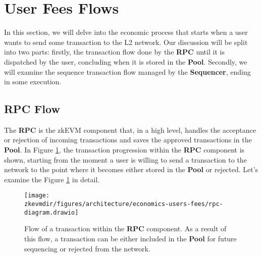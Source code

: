 


\section{User Fees Flows}

In this section, we will delve into the economic process that starts when a user wants to send some transaction to the L2 network. Our discussion will be split into two parts: firstly, the transaction flow done by the \textbf{RPC} until it is dispatched by the user, concluding when it is stored in the \textbf{Pool}. Secondly, we will examine the sequence transaction flow managed by the \textbf{Sequencer}, ending in some execution.

\subsection{RPC Flow}

The \textbf{RPC} is the zkEVM component that, in a high level, handles the acceptance or rejection of incoming transactions and saves the approved transactions in the \textbf{Pool}. In Figure \ref{fig:rpc-flow}, the transaction progression within the \textbf{RPC} component is shown, starting from the moment a user is willing to send a transaction to the network to the point where it becomes either stored in the \textbf{Pool} or rejected. Let's examine the Figure \ref{fig:rpc-flow} in detail.


\begin{figure}[H]
\centering
\texttt{[image: \\zkevmdir/figures/architecture/economics-users-fees/rpc-diagram.drawio]}
\caption{Flow of a transaction within the \textbf{RPC} component. As a result of this flow, a transaction can be either included in the \textbf{Pool} for future sequencing or rejected from the network. }
\label{fig:rpc-flow}
\end{figure}

